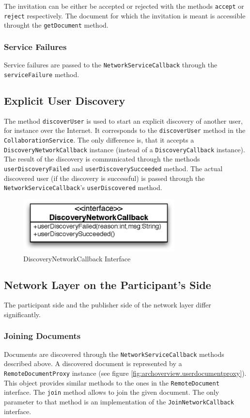 The invitation can be either be accepted or rejected with the methods
\texttt{accept} or \texttt{reject} respectively. The document for which
the invitation is meant is accessible throught the \texttt{get\-Document}
method.


\subsubsection{Service Failures}
Service failures are passed to the \texttt{NetworkServiceCallback} through
the \texttt{serviceFailure} method.


\subsection{Explicit User Discovery}
The method \texttt{discoverUser} is used to start an explicit discovery
of another user, for instance over the Internet. It corresponds to the
\texttt{discoverUser} method in the \texttt{CollaborationService}. The
only difference is, that it accepts a \texttt{DiscoveryNetworkCallback}
instance (instead of a \texttt{DiscoveryCallback} instance). The result
of the discovery is communicated through the methods 
\texttt{userDiscoveryFailed} and \texttt{userDiscoverySucceeded} method.
The actual discovered user (if the discovery is successful) is passed 
through the \texttt{NetworkServiceCallback}'s \texttt{userDiscovered} 
method.

\begin{figure}[H]
 \centering
 \includegraphics[width=8.26cm,height=2.86cm]{../images/finalreport/architecture_discoverynetworkcallback_uml.eps}
 \caption{DiscoveryNetworkCallback Interface}
\end{figure}


\subsection{Network Layer on the Participant's Side}
The participant side and the publisher side of the network layer differ
significantly.

\subsubsection{Joining Documents}
Documents are discovered through the \texttt{NetworkServiceCallback} methods
described above. A discovered document is represented by a 
\texttt{RemoteDocumentProxy} instance
(see figure \ref{fig:archoverview.userdocumentproxy}). 
This object provides similar methods
to the ones in the \texttt{RemoteDocument} interface. The \texttt{join}
method allows to join the given document. The only parameter to that method
is an implementation of the \texttt{JoinNetworkCallback} interface.

